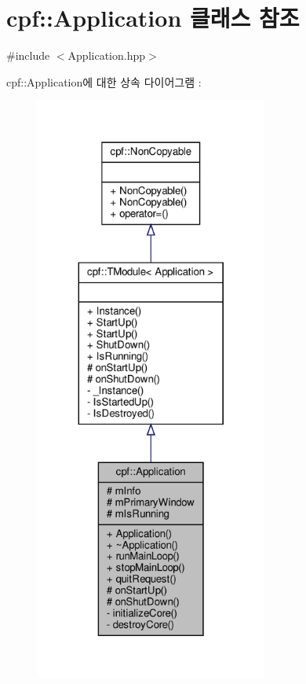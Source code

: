 \hypertarget{classcpf_1_1_application}{}\section{cpf\+:\+:Application 클래스 참조}
\label{classcpf_1_1_application}


{\ttfamily \#include $<$Application.\+hpp$>$}



cpf\+:\+:Application에 대한 상속 다이어그램 \+: 
\nopagebreak
\begin{figure}[H]
\begin{center}
\leavevmode
\includegraphics[height=550pt]{classcpf_1_1_application__inherit__graph}
\end{center}
\end{figure}


